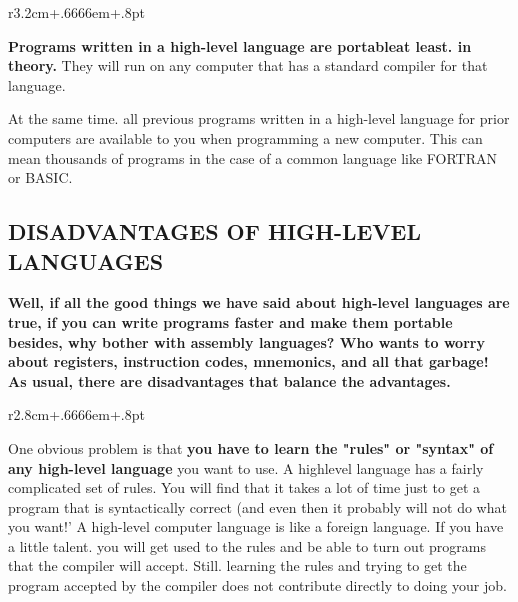 \documentclass{book}
\begin{document}
\begin{wrapfigure}{r}{3.2cm+.6666em+.8pt}
\end{wrapfigure}
\textbf{Programs written in a high-level language are portableat least. in theory.} They will run on any computer that has a standard compiler for that language. 

At the same time. all previous programs written in a high-level language for prior computers are available to you when programming a new computer. This can mean thousands of programs in the case of a common language like FORTRAN or BASIC.

\subsection*{DISADVANTAGES OF HIGH-LEVEL LANGUAGES}
\textbf{Well, if all the good things we have said about high-level languages are true, if you can write programs faster and make them portable besides, why bother with assembly languages? Who wants to worry about registers, instruction codes, mnemonics, and all that garbage! As usual, there are disadvantages that balance the advantages.}

\begin{wrapfigure}{r}{2.8cm+.6666em+.8pt}
\end{wrapfigure}
One obvious problem is that \textbf{you have to learn the "rules" or "syntax" of any high-level language} you want to use. A highlevel language has a fairly complicated set of rules. You will find that it takes a lot of time just to get a program that is syntactically correct (and even then it probably will not do what you want!' A high-level computer language is like a foreign language. If you have a little talent. you will get used to the rules and be able to turn out programs that the compiler will accept. Still. learning the rules and trying to get the program accepted by the compiler does not contribute directly to doing your job.
\end{document}
